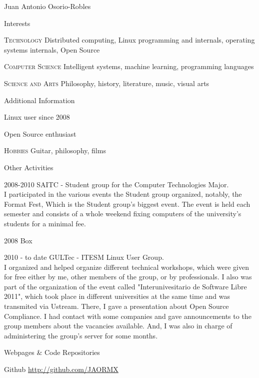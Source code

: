 \documentclass[spanish,10pt,letterpaper]{article}
\begin{document}
\begin{cv}{Juan Antonio Osorio-Robles}
	\begin{cvlist}{Interests}
		\item [\textsc {Technology}]
				Distributed computing, Linux programming and internals, operating systems internals, Open Source
		\item [\textsc {Computer Science}]
				Intelligent systems, machine learning, programming languages
		\item [\textsc {Science and Arts}]
				Philosophy, history, literature, music, visual arts 
	\end{cvlist}

	\begin{cvlist}{Additional Information}
		\item [  ] Linux user since 2008
		\item [  ] Open Source enthusiast
		\item [\textsc {Hobbies}]
				Guitar, philosophy, films
	\end{cvlist}

	\begin{cvlist}{Other Activities}
		\item [2008-2010] SAITC - Student group for the Computer Technologies Major.\\
			I participated in the various events the Student group organized, notably, the Format Fest, Which is the Student group's biggest event. The event is held each semester and consists of a whole weekend fixing computers of the university's students for a minimal fee. 
		\item [2008] Box
		\item [2010 - to date] GULTec - ITESM Linux User Group.\\
			I organized and helped organize different technical workshops, which were given for free either by me, other members of the group, or by professionals. I also was part of the organization of the event called "Interunivesitario de Software Libre 2011", which took place in different universities at the same time and was transmited via Ustream. There, I gave a presentation about Open Source Compliance. I had contact with some companies and gave announcements to the group members about the vacancies available. And, I was also in charge of administering the group's server for some months.
	\end{cvlist}

	\begin{cvlist}{Webpages \& Code Repositories}
		\item [Github] \href{http://github.com/JAORMX}{http://github.com/JAORMX}
	\end{cvlist}
	

\end{cv}
\end{document}
